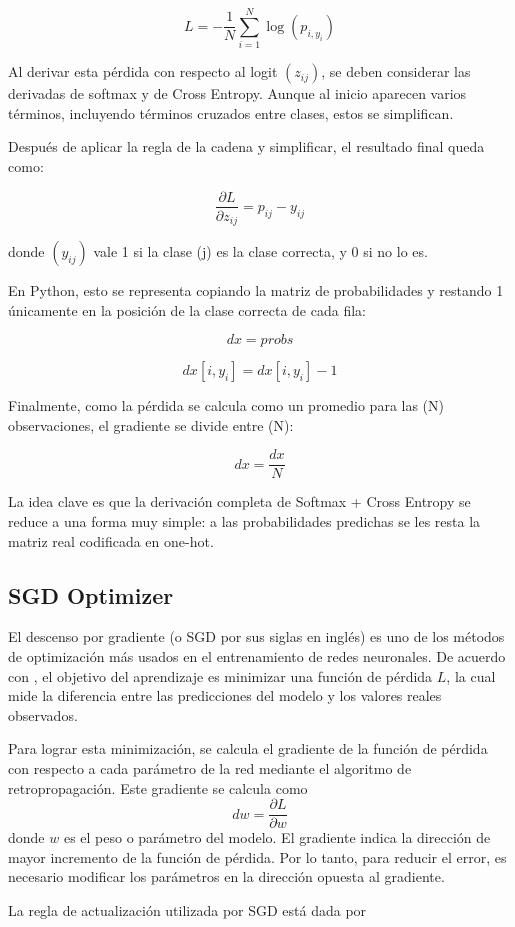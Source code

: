 \documentclass[12pt]{article}
\begin{document}
$$
L = -\frac{1}{N}\sum_{i=1}^{N}\log(p_{i,y_i})
$$

Al derivar esta pérdida con respecto al logit $(z_{ij})$, se deben considerar las derivadas de softmax y de Cross 
Entropy. Aunque al inicio aparecen varios términos, incluyendo términos cruzados entre clases, estos se simplifican.

Después de aplicar la regla de la cadena y simplificar, el resultado final queda como:

$$
\frac{\partial L}{\partial z_{ij}} = p_{ij} - y_{ij}
$$

donde $(y_{ij})$ vale 1 si la clase (j) es la clase correcta, y 0 si no lo es.

En Python, esto se representa copiando la matriz de probabilidades y restando 1 únicamente en la posición de la 
clase correcta de cada fila:

$$
dx = probs
$$

$$
dx[i, y_i] = dx[i, y_i] - 1
$$

Finalmente, como la pérdida se calcula como un promedio para las (N) observaciones, el gradiente se divide entre (N):

$$
dx = \frac{dx}{N}
$$

La idea clave es que la derivación completa de Softmax + Cross Entropy se reduce a una forma muy simple: a 
las probabilidades predichas se les resta la matriz real codificada en one-hot.


\subsection{SGD Optimizer}
El descenso por gradiente (o SGD por sus siglas en inglés) es uno de los métodos de optimización 
más usados en el entrenamiento de redes neuronales. De acuerdo con \textcite{Goodfellow2016}, el 
objetivo del aprendizaje es minimizar una función de pérdida $L$, la cual mide la diferencia entre
las predicciones del modelo y los valores reales observados.

Para lograr esta minimización, se calcula el gradiente de la función de pérdida con respecto a cada
parámetro de la red mediante el algoritmo de retropropagación. Este gradiente se calcula como
$$dw = \frac{\partial L}{\partial w}$$
donde $w$ es el peso o parámetro del modelo. El gradiente indica la dirección de mayor incremento de la 
función de pérdida. Por lo tanto, para reducir el error, es necesario modificar los parámetros en la
dirección opuesta al gradiente.

La regla de actualización utilizada por SGD está dada por
\end{document}

